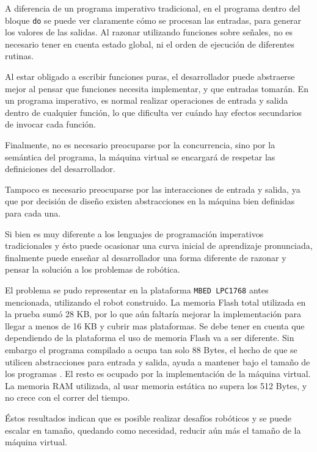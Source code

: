   A diferencia de un programa imperativo tradicional, en el programa
\frob{} dentro del bloque \texttt{do} se puede ver claramente cómo
se procesan las entradas, para generar los valores de las salidas.
  Al razonar utilizando funciones sobre señales, no es necesario
tener en cuenta estado global, ni el orden de ejecución de
diferentes rutinas.

  Al estar obligado a escribir funciones puras, el desarrollador
puede abstraerse mejor al pensar que funciones necesita implementar,
y que entradas tomarán. En un programa imperativo, es normal realizar
operaciones de entrada y salida dentro de cualquier función, lo que
dificulta ver cuándo hay efectos secundarios de invocar cada función.

  Finalmente, no es necesario preocuparse por la concurrencia, sino
por la semántica del programa, la máquina virtual se encargará de
respetar las definiciones del desarrollador.

  Tampoco es necesario preocuparse por las interacciones de entrada
y salida, ya que por decisión de diseño existen abstracciones en
la máquina bien definidas para cada una.

  Si bien \frob{} es muy diferente a los lenguajes de
programación imperativos tradicionales y ésto puede ocasionar una
curva inicial de aprendizaje pronunciada, finalmente puede enseñar al
desarrollador una forma diferente de razonar y pensar la solución
a los problemas de robótica.

  El problema se pudo representar en la plataforma \texttt{MBED LPC1768} antes
mencionada, utilizando el robot construido.
  La memoria Flash total utilizada en la prueba sumó 28 KB, por lo que
aún faltaría mejorar la implementación para llegar a menos de 16 KB y
cubrir mas plataformas. Se debe tener en cuenta que dependiendo de la
plataforma el uso de memoria Flash va a ser diferente.
  Sin embargo el programa \frob{} compilado a \alf{} ocupa tan solo 88 Bytes,
el hecho de que se utilicen abstracciones para entrada y salida, ayuda a mantener
bajo el tamaño de los programas \alf{}. El resto es ocupado por la implementación de
la máquina virtual.
  La memoria RAM utilizada, al usar memoria estática no supera los 512 Bytes, y no
crece con el correr del tiempo.

  Éstos resultados indican que es posible realizar desafíos robóticos y se puede
escalar en tamaño, quedando como necesidad, reducir aún más el tamaño de la
máquina virtual.
